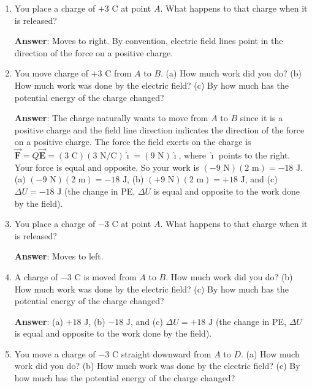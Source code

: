 \documentclass{article}
\newcommand{\ihat}[0]{\hat{\boldsymbol{\imath}}}
\newcommand{\bfvec}[1]{\vec{\mathbf{#1}}}
\begin{document}
\begin{enumerate}

  \item You place a charge of $+3\text{ C}$ at point $A$. What happens to that charge when it is released?

        \ifsolutions
        \textbf{Answer}: Moves to right. By convention, electric field lines point in the direction of the force on a positive charge.
        \else
        \vskip 36pt
        \fi

  \item You move charge of $+3\text{ C}$ from $A$ to $B$. (a) How much work did you do? (b) How much work was done by the electric field? (c) By how much has the potential energy of the charge changed?

        \ifsolutions
        \textbf{Answer}: The charge naturally wants to move from $A$ to $B$ since it is a positive charge and the field line direction indicates the direction of the force on a positive charge. The force the field exerts on the charge is $\bfvec{F}=Q\bfvec{E}=(3\text{ C})(3\text { N/C})\ihat = (9\text{ N})\ihat$, where $\ihat$ points to the right. Your force is equal and opposite. So your work is $(-9\text{ N})(2\text{ m}) = -18 \text{ J}$.
        (a) $(-9 \text{ N})(2\text { m})=-18\text{ J}$, (b) $(+9 \text{ N})(2\text { m})=+18\text{ J}$, and (c) $\Delta U = -18\text{ J}$ (the change in PE, $\Delta U$ is equal and opposite to the work done by the field).
        \else
        \vskip 36pt
        \fi

  \item You place a charge of $-3\text{ C}$ at point $A$. What happens to that charge when it is released?

        \ifsolutions
        \textbf{Answer}: Moves to left.
        \else
        \vskip 48pt
        \fi

  \item A charge of $-3\text{ C}$ is moved from $A$ to $B$. How much work did you do? (b) How much work was done by the electric field? (c) By how much has the potential energy of the charge changed?

        \ifsolutions
        \textbf{Answer}: (a) $+18\text{ J}$, (b) $-18\text{ J}$, and (c) $\Delta U = +18\text{ J}$ (the change in PE, $\Delta U$ is equal and opposite to the work done by the field).
        \else
        \vskip 48pt
        \fi

  \item You move a charge of $-3\text{ C}$ straight downward from $A$ to $D$. (a) How much work did you do? (b) How much work was done by the electric field? (c) By how much has the potential energy of the charge changed?


\end{enumerate}
\end{document}
